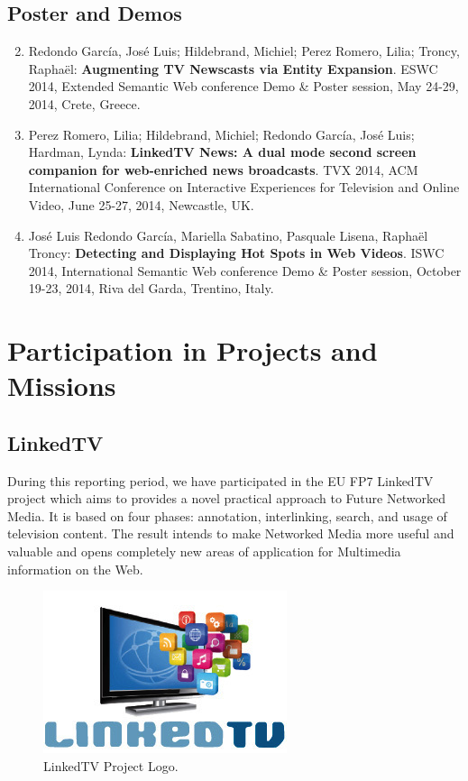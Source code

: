 \documentclass[a4paper,11pt]{report}
\begin{document}
\section*{Poster and Demos}
\begin{enumerate}
\setcounter{enumi}{1}

\item Redondo Garc\'ia, Jos\'e Luis; Hildebrand, Michiel; Perez Romero, Lilia; Troncy, Rapha\"el:
\textbf{Augmenting TV Newscasts via Entity Expansion}.
ESWC 2014, Extended Semantic Web conference Demo \& Poster session, May 24-29, 2014, Crete, Greece.

\item Perez Romero, Lilia; Hildebrand, Michiel; Redondo Garc\'ia, Jos\'e Luis; Hardman, Lynda:
\textbf{LinkedTV News: A dual mode second screen companion for web-enriched news broadcasts}.
TVX 2014, ACM International Conference on Interactive Experiences for Television and Online Video, June 25-27, 2014, Newcastle, UK.

\item Jos\'e Luis Redondo Garc\'ia, Mariella Sabatino, Pasquale Lisena, Rapha\"el Troncy:
\textbf{Detecting and Displaying Hot Spots in Web Videos}.
ISWC 2014, International Semantic Web conference Demo \& Poster session, October 19-23, 2014, Riva del Garda, Trentino, Italy.


\end{enumerate}



\chapter*{Participation in Projects and Missions}

\section*{LinkedTV}

During this reporting period, we have participated in the EU FP7 LinkedTV project which aims to provides a novel practical approach to Future Networked Media. It is based on four phases: annotation, interlinking, search, and usage of television content. The result intends to make Networked Media more useful and valuable and opens completely new areas of application for Multimedia information on the Web.  

\begin{figure} [h]
\centering
\includegraphics [scale=0.50] {figure/linkedtv_logo.png}
\caption{LinkedTV Project Logo.}
\label{fig:linkedtv_logo}
\end{figure} 
\end{document}
